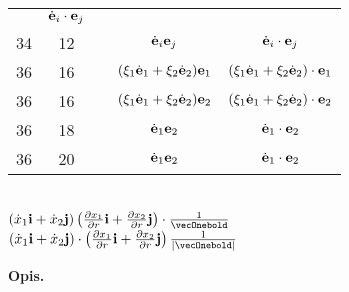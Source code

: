 \documentclass[a4paper,11pt]{article}
\begin{document}
\begin{center}
\begin{tabular}{|c|c|c|c|c|}
           & $\dot{ \mathbf{e} }_{ i } \cdot \mathbf{e}_{ j }$ \\
    34  & 12 & & $\dot{ \mathbf{e} }_{ i } \mathbf{e}_{ j }$
           & $\dot{ \mathbf{e} }_{ i } \cdot \mathbf{e}_{ j }$ \\
    36  & 16 & & $( \xi_{ 1 } \dot{ \mathbf{e} }_{ 1 }
                 + \xi_{ 2 } \dot{ \mathbf{e} }_{ 2 }  ) \mathbf{e}_{ 1 }$
           & $( \xi_{ 1 } \dot{ \mathbf{e} }_{ 1 }
             + \xi_{ 2 } \dot{ \mathbf{e} }_{ 2 }  ) \cdot \mathbf{e}_{ 1 }$ \\
    36  & 16 & & $( \xi_{ 1 } \dot{ \mathbf{e} }_{ 1 }
                 + \xi_{ 2 } \dot{ \mathbf{e} }_{ 2 }  ) \mathbf{e}_{ 2 }$
           & $( \xi_{ 1 } \dot{ \mathbf{e} }_{ 1 }
             + \xi_{ 2 } \dot{ \mathbf{e} }_{ 2 }  ) \cdot \mathbf{e}_{ 2 }$ \\
    36  & 18 & & $\dot{ \mathbf{e} }_{ 1 } \mathbf{e}_{ 2 }$
           & $\dot{ \mathbf{e} }_{ 1 } \cdot \mathbf{e}_{ 2 }$ \\
    36  & 20 & & $\dot{ \mathbf{e} }_{ 1 } \mathbf{e}_{ 2 }$
           & $\dot{ \mathbf{e} }_{ 1 } \cdot \mathbf{e}_{ 2 }$ \\
    \hline
  \end{tabular}

\end{center}


\noindent
{} \\[0.3em]
\Jest
$( \dot{ x }_{ 1 } \vecibold + \dot{ x }_{ 2 } \vecjbold )
\left( \frac{ \partial x_{ 1 } }{ \partial r } \vecibold
  + \frac{ \partial x_{ 2 } }{ \partial r } \vecjbold \right)
\cdot \frac{ 1 }{ \vecOnebold }$ \\[0.5em]
\Powin
$( \dot{ x }_{ 1 } \vecibold + \dot{ x }_{ 2 } \vecjbold )
\cdot \left( \frac{ \partial x_{ 1 } }{ \partial r } \vecibold
  + \frac{ \partial x_{ 2 } }{ \partial r } \vecjbold \right)
\frac{ 1 }{ | \vecOnebold | }$ \\


\vspace{\spaceTwo}










\begin{center}

  \Large{\textbf{Opis.}}

\end{center}
\end{document}
